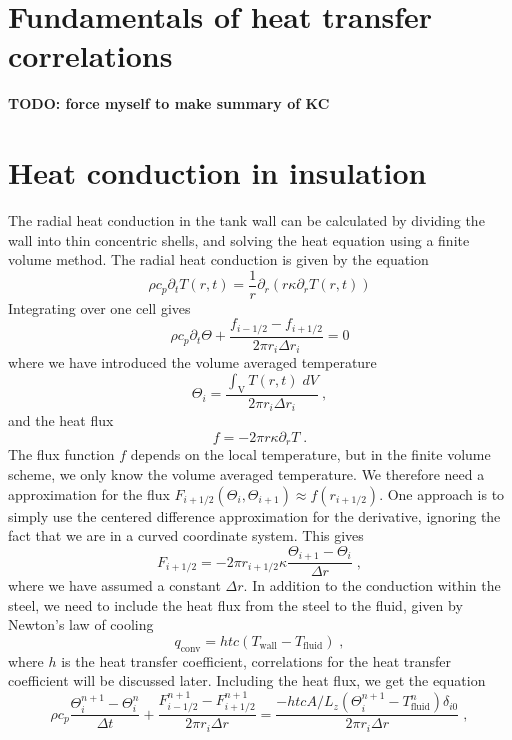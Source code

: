 \documentclass{article}
\begin{document}
\section{Fundamentals of heat transfer correlations}
\textbf{TODO: force myself to make summary of KC}
\section{Heat conduction in insulation}
The radial heat conduction in the tank wall can be calculated by dividing the wall into thin concentric shells, and solving the heat equation using a finite volume method. The radial heat conduction is given by the equation
\begin{equation}
    \rho c_{p} \partial_{t} T\left( r,t \right)
    = \frac{1}{r}\partial_{r} \left( r \kappa \partial_{r} T\left( r,t \right)
    \right)
    \label{eq:heat_equation}
\end{equation}
Integrating over one cell gives
\begin{equation}
    \rho c_{p} \partial_{t} \Theta + \frac{f_{i-1/2} - f_{i+1/2}}{2 \pi r_{i} \Delta r_{i}} = 0
\end{equation}
where we have introduced the volume averaged temperature
\begin{equation}
    \Theta_{i} = \frac{\int_{\text{V}}T\left(r,t\right)\;dV}{2 \pi r_{i} \Delta r_{i}}\:,
\end{equation}
and the heat flux
\begin{equation}
    f = - 2 \pi r \kappa \partial_{r} T\;.
\end{equation}
The flux function $f$ depends on the local temperature, but in the finite volume scheme, we only know the volume averaged temperature. We therefore need a approximation for the flux $F_{i+1/2}\left( \Theta_{i}, \Theta_{i+1} \right) \approx f\left( r_{i+1/2} \right)$. One approach is to simply use the centered difference approximation for the derivative, ignoring the fact that we are in a curved coordinate system. This gives
\begin{equation}
    F_{i+1/2} = - 2 \pi r_{i+1/2} \kappa \frac{\Theta_{i+1} - \Theta_{i}}{\Delta r}\;,
\end{equation}
where we have assumed a constant $\Delta r$. In addition to the conduction within the steel, we need to include the heat flux from the steel to the fluid, given by Newton's law of cooling
\begin{equation}
    q_{\text{conv}} = htc\left( T_{\text{wall}} - T_{\text{fluid}} \right)\;,
\end{equation}
where $h$ is the heat transfer coefficient, correlations for the heat transfer coefficient will be discussed later. Including the heat flux, we get the equation
\begin{equation}
    \rho c_{p} \frac{\Theta_{i}^{n+1} - \Theta_{i}^{n}}{\Delta t} + \frac{F_{i-1/2}^{n+1} - F_{i+1/2}^{n+1}}{2 \pi r_{i} \Delta r} = \frac{- htc A / L_{z} \left( \Theta_{i}^{n+1} - T_{\text{fluid}}^n \right) \delta_{i0} }{2 \pi r_{i} \Delta r}\;,
    \label{eq:heat_conduction}
\end{equation}
\end{document}
